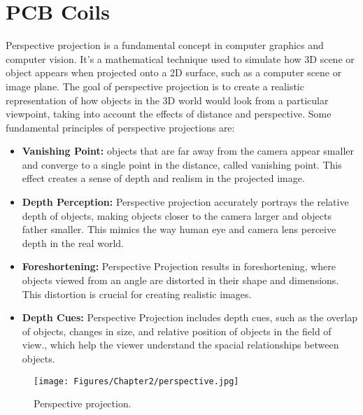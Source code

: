 \section{PCB Coils}
\label{Chapter2/PerspProj}
Perspective projection is a fundamental concept in computer graphics and computer vision. It's a mathematical technique used to simulate how 3D scene or object appears when projected onto a 2D surface, such as a computer scene or image plane. The goal of perspective projection is to create a realistic representation of how objects in the 3D world would look from a particular viewpoint, taking into account the effects of distance and perspective. Some fundamental principles of perspective projections are:
\begin{itemize}
    \item\textbf{Vanishing Point:} objects that are far away from the camera appear smaller and converge to a single point in the distance, called vanishing point. This effect creates a sense of depth and realism in the projected image.
    \item\textbf{Depth Perception:} Perspective projection accurately portrays the relative depth of objects, making objects closer to the camera larger and objects father smaller. This mimics the way human eye and camera lens perceive depth in the real world.
    \item\textbf{Foreshortening:} Perspective Projection results in foreshortening, where objects viewed from an angle are distorted in their shape and dimensions. This distortion is crucial for creating realistic images.
    \item\textbf{Depth Cues:} Perspective Projection includes depth cues, such as the overlap of objects, changes in size, and relative position of objects in the field of view., which help the viewer understand the spacial relationships between objects.
\end{itemize}

\begin{figure}[th]
    \centering
    \texttt{[image: Figures/Chapter2/perspective.jpg]}
    \caption[Perspective projection]{Perspective projection.}
    \label{fig:Projection}
\end{figure}

